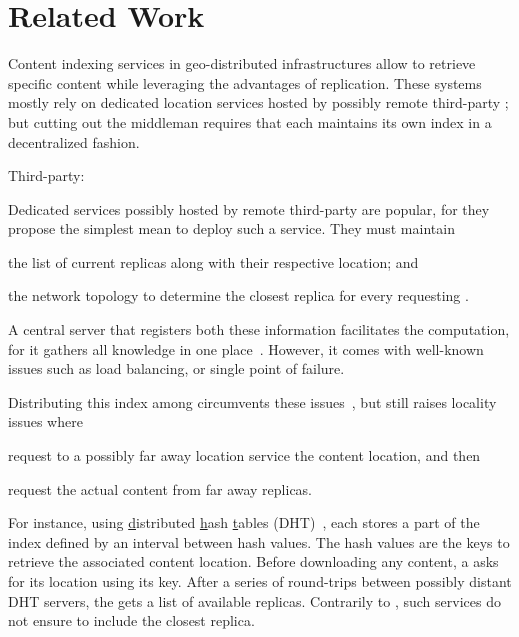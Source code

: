 
\section{Related Work}
\label{sec:related_work}

Content indexing services in geo-distributed infrastructures allow
\processes to retrieve specific content while leveraging the
advantages of replication. These systems mostly rely on dedicated
location services hosted by possibly remote third-party \processes; but
cutting out the middleman requires that each \process maintains its
own index in a decentralized fashion.

\begin{asparadesc}
\item [Third-party:]

Dedicated services possibly hosted by remote third-party \processes
are popular, for they propose the simplest mean to deploy such a
service. They must maintain
\begin{inparaenum}[(i)]
\item the list of current replicas along with their respective
  location; and
\item the network topology to determine the closest replica for every
  requesting \process.
\end{inparaenum}

\noindent A central server that registers both these information
facilitates the computation, for it gathers all knowledge in one
place~\cite{snamp, p2p-oracle, fogstore, p2p-alto}. However, it comes with
well-known issues such as load balancing, or single point of failure.

\noindent Distributing this index among \processes circumvents these
issues~\cite{voronet, ipfs, mdht, squirrel, coin_19}, but still raises
locality issues where \processes
\begin{inparaenum}[(i)]
\item request to a possibly far away location service the content
  location, and then
\item request the actual content from far away replicas.
\end{inparaenum}
For instance, using \underline{d}istributed \underline{h}ash
\underline{t}ables (DHT)~\cite{ipfs, mdht, squirrel}, each \process
stores a part of the index defined by an interval between hash values.
The hash values are the keys to retrieve the associated content
location.  Before downloading any content, a \node asks for its
location using its key. After a series of round-trips between possibly
distant DHT servers, the \node gets a list of available
replicas. Contrarily to \NAME, such services do not ensure to include
the closest replica.


\end{asparadesc}
